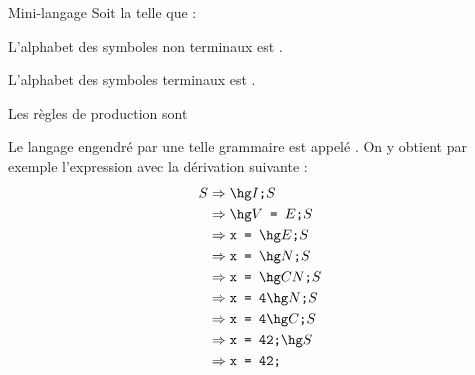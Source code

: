 \documentclass[a4paper,french,bookmarks]{book}
\begin{document}
    \begin{example}{Mini-langage}{}
        Soit  la  telle que :
        \begin{enumerate}
            \itt L'alphabet des symboles non terminaux est .
            
            \itt L'alphabet des symboles terminaux est .
            
            \itt Les règles de production sont 
        \end{enumerate}
        Le langage \hg{$\bcL\p{\bcG}$} engendré par une telle grammaire est appelé . On y obtient par exemple l'expression  avec la dérivation suivante :
        \begin{align*}
            S &\Rightarrow \hg I\texttt{;}S\\
            &\Rightarrow \hg V\texttt{ = }E\texttt{;}S\\
            &\Rightarrow \texttt{x = }\hg E\texttt{;}S\\
            &\Rightarrow \texttt{x = }\hg N\texttt{;}S\\
            &\Rightarrow \texttt{x = }\hg CN\texttt{;}S\\
            &\Rightarrow \texttt{x = 4}\hg N\texttt{;}S\\
            &\Rightarrow \texttt{x = 4}\hg C\texttt{;}S\\
            &\Rightarrow \texttt{x = 42;}\hg S\\
            &\Rightarrow \texttt{x = 42;}
        \end{align*}
    \end{example}
    
\end{document}
